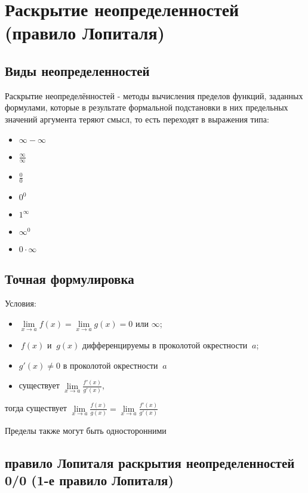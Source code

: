 \section{ Раскрытие неопределенностей (правило Лопиталя)}

\subsection{Виды неопределенностей}

Раскрытие неопределённостей - методы вычисления пределов функций, заданных формулами, которые в результате формальной подстановки в них предельных значений аргумента теряют смысл, то есть переходят в выражения типа:

\begin{itemize}
\item 
$ \infty-\infty $
\item 
$ \frac{\infty}{\infty} $
\item 
$ \frac{0}{0} $
\item 
$ 0^0 $
\item 
$ 1^\infty $
\item 
$ \infty^0 $
\item 
$ 0\cdot\infty $
\end{itemize}


\subsection{Точная формулировка}

Условия:
\begin{itemize}
\item 
$\lim\limits_{x\to a}{f(x)}=\lim\limits_{x\to a}{g(x)}=0$ или $\infty$;
\item 
$~f(x)$ и $~g(x)$ дифференцируемы в проколотой окрестности $~a$;
\item 
$g'(x)\neq 0$ в проколотой окрестности $~a$
\item 
существует $\lim\limits_{x\to a}{\frac{f'(x)}{g'(x)}}$,
\end{itemize}

тогда существует $\lim\limits_{x\to a}{\frac{f(x)}{g(x)}} = \lim\limits_{x\to a}{\frac{f'(x)}{g'(x)}}$

Пределы также могут быть односторонними

\subsection{правило Лопиталя раскрытия неопределенностей 0/0 (1-е правило Лопиталя)}

